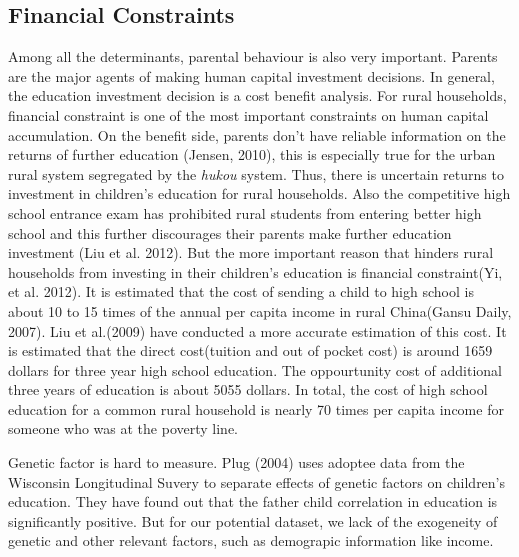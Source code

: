 \documentclass[12pt]{article}%
\theoremstyle{definition}
\numberwithin{equation}{section}
\begin{document}
\subsection{Financial Constraints} 
Among all the determinants, parental behaviour is also very important. Parents are the major agents of making human capital investment decisions. In general, the education investment decision is a cost benefit analysis.  For rural households, financial constraint is one of the most important constraints on human capital accumulation. On the benefit side, parents don't have reliable information on the returns of further education (Jensen, 2010), this is especially true for the urban rural system segregated by the \textit{hukou} system. Thus, there is uncertain returns to investment in children's education for rural households. Also the competitive high school entrance exam has prohibited rural students from entering better high school and this further discourages their parents make further education investment (Liu et al. 2012).  But the more important reason that hinders rural households from investing in their children's education is financial constraint(Yi, et al. 2012).  It is estimated that the cost of sending a child to high school is about 10 to 15 times of the annual per capita income in rural China(Gansu Daily, 2007). Liu et al.(2009) have conducted a more accurate estimation of this cost.  It is estimated that the direct cost(tuition and out of pocket cost) is around 1659 dollars for three year high school education. The oppourtunity cost of additional three years of education is about 5055 dollars. In total, the cost of high school education for a common rural household is nearly 70 times per capita income for someone who was at the poverty line. 

Genetic factor is hard to measure. Plug (2004) uses adoptee data from the Wisconsin Longitudinal Suvery to separate effects of genetic factors on children's education. They have found out that the father child correlation in education is significantly positive. But for our potential dataset, we lack of the exogeneity of genetic and other relevant factors, such as demograpic information like income.  
\end{document}
